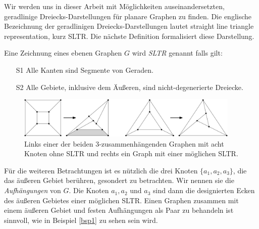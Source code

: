 Wir werden uns in dieser Arbeit mit Möglichkeiten auseinandersetzten, geradlinige Dreiecks-Darstellungen für planare Graphen zu finden. Die englische Bezeichnung der geradlinigen Dreiecks-Darstellungen lautet straight line triangle representation, kurz SLTR. Die nächste Definition formalisiert diese Darstellung.

\begin{definition}[SLTR]\label{defsltr}
Eine Zeichnung eines ebenen Graphen $G$ wird \textit{SLTR} genannt falls gilt:
\begin{itemize}
\item[S1] Alle Kanten sind Segmente von Geraden.
\item[S2] Alle Gebiete, inklusive dem Äußeren, sind nicht-degenerierte Dreiecke.
\end{itemize}
\end{definition}

\begin{figure}[h]
	\centering
  \includegraphics[width=0.95\textwidth]{sltr-example.png}
	\caption{Links einer der beiden 3-zusammenhängenden Graphen mit acht Knoten ohne SLTR und rechts ein Graph mit einer möglichen SLTR.}
\end{figure}

Für die weiteren Betrachtungen ist es nützlich die drei Knoten $\{a_1,a_2,a_3\}$, die das äußeren Gebiet berühren, gesondert zu betrachten. Wir nennen sie die \textit{Aufhängungen} von $G$. Die Knoten $a_1,a_2$ und $a_3$ sind dann die designierten Ecken des äußeren Gebietes einer möglichen SLTR. Einen Graphen zusammen mit einem äußeren Gebiet und festen Aufhängungen als Paar zu behandeln ist sinnvoll, wie in Beispiel \ref{bsp1} zu sehen sein wird.

